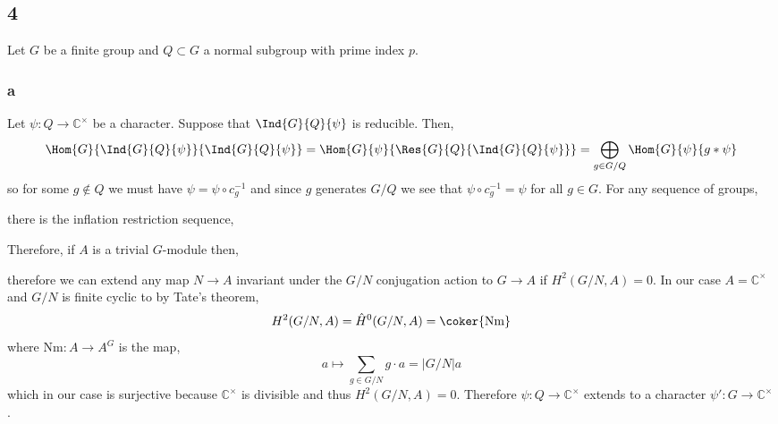 \documentclass[12pt]{article}
\renewcommand{\C}{\mathbb{C}}
\begin{document}
\subsection{4}

Let $G$ be a finite group and $Q \subset G$ a normal subgroup with prime index $p$.

\subsubsection{a}

Let $\psi : Q \to \C^\times$ be a character. Suppose that $\Ind{G}{Q}{\psi}$ is reducible. Then,
\[ \Hom{G}{\Ind{G}{Q}{\psi}}{\Ind{G}{Q}{\psi}} = \Hom{G}{\psi}{\Res{G}{Q}{\Ind{G}{Q}{\psi}}} = \bigoplus_{g \in G / Q} \Hom{G}{\psi}{g * \psi} \]
so for some $g \notin Q$ we must have $\psi = \psi \circ c_g^{-1}$ and since $g$ generates $G/Q$ we see that $\psi \circ c_g^{-1} = \psi$ for all $g \in G$. For any sequence of groups,
\begin{center}
\end{center}
there is the inflation restriction sequence,
\begin{center}
\end{center}
Therefore, if $A$ is a trivial $G$-module then,
\begin{center}
\end{center}
therefore we can extend any map $N \to A$ invariant under the $G/N$ conjugation action to $G \to A$ if $H^2(G/N, A) = 0$. In our case $A = \C^\times$ and $G/N$ is finite cyclic to by Tate's theorem,
\[ H^2(G/N, A) = \hat{H}^0(G/N, A) = \coker{\mathrm{Nm}} \]
where $\mathrm{Nm} : A \to A^G$ is the map,
\[ a \mapsto \sum_{g \in G/N} g \cdot a = |G/N| a \]
which in our case is surjective because $\C^\times$ is divisible and thus $H^2(G/N, A) = 0$. Therefore $\psi : Q \to \C^\times$ extends to a character $\psi' : G \to \C^\times$.
\end{document}
